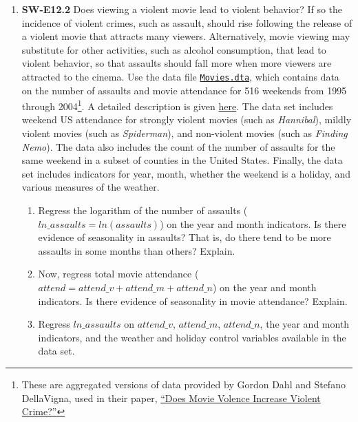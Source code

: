 \documentclass[
]{article}
\begin{document}
\begin{enumerate}
\def\labelenumi{\arabic{enumi}.}
\setcounter{enumi}{5}
\item
  \textbf{SW-E12.2} Does viewing a violent movie lead to violent
  behavior? If so the incidence of violent crimes, such as assault,
  should rise following the release of a violent movie that attracts
  many viewers. Alternatively, movie viewing may substitute for other
  activities, such as alcohol consumption, that lead to violent
  behavior, so that assaults should fall more when more viewers are
  attracted to the cinema. Use the data file
  \href{../Movies.dta}{\texttt{Movies.dta}}, which contains data on the
  number of assaults and movie attendance for 516 weekends from 1995
  through 2004\footnote{These are aggregated versions of data provided
    by Gordon Dahl and Stefano DellaVigna, used in their paper,
    \href{https://eml.berkeley.edu//~sdellavi/wp/moviescrime08-08-01Forthc.pdf}{``Does
    Movie Volence Increase Violent Crime?''}}. A detailed description is
  given \href{../materials/movies_description.pdf}{here}. The data set
  includes weekend US attendance for strongly violent movies (such as
  \emph{Hannibal}), mildly violent movies (such as \emph{Spiderman}),
  and non-violent movies (such as \emph{Finding Nemo}). The data also
  includes the count of the number of assaults for the same weekend in a
  subset of counties in the United States. Finally, the data set
  includes indicators for year, month, whether the weekend is a holiday,
  and various measures of the weather.

  \begin{enumerate}
  \def\labelenumii{\alph{enumii}.}
  \item
    Regress the logarithm of the number of assaults
    (\(ln\_assaults= ln(assaults)\)) on the year and month indicators.
    Is there evidence of seasonality in assaults? That is, do there tend
    to be more assaults in some months than others? Explain.
  \item
    Now, regress total movie attendance
    (\(attend = attend\_v + attend\_m + attend\_n\)) on the year and
    month indicators. Is there evidence of seasonality in movie
    attendance? Explain.
  \item
    Regress \(ln\_assaults\) on \(attend\_v\), \(attend\_m\),
    \(attend\_n\), the year and month indicators, and the weather and
    holiday control variables available in the data set.


\end{enumerate}
\end{enumerate}
\end{document}
